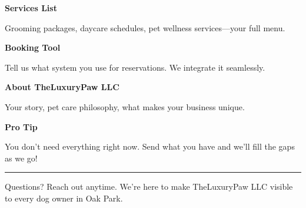 \documentclass[11pt,letterpaper]{article}
\begin{document}
\hfill
\begin{minipage}[t]{0.48\textwidth}
\begin{tcolorbox}[colframe=accent-teal, boxrule=1pt, left=0.7em, right=0.7em, top=0.5em, bottom=0.5em, arc=4pt, boxsep=0pt]
{\bfseries\small\color{accent-teal}Services List}

\vspace{0.15em}

{\small Grooming packages, daycare schedules, pet wellness services—your full menu.}
\end{tcolorbox}

\vspace{0.1em}

\begin{tcolorbox}[colframe=accent-teal, boxrule=1pt, left=0.7em, right=0.7em, top=0.5em, bottom=0.5em, arc=4pt, boxsep=0pt]
{\bfseries\small\color{accent-teal}Booking Tool}

\vspace{0.15em}

{\small Tell us what system you use for reservations. We integrate it seamlessly.}
\end{tcolorbox}

\vspace{0.1em}

\begin{tcolorbox}[colframe=accent-teal, boxrule=1pt, left=0.7em, right=0.7em, top=0.5em, bottom=0.5em, arc=4pt, boxsep=0pt]
{\bfseries\small\color{accent-teal}About TheLuxuryPaw LLC}

\vspace{0.15em}

{\small Your story, pet care philosophy, what makes your business unique.}
\end{tcolorbox}

\vspace{-0.2em}
\end{minipage}

\vspace{0.15em}

\begin{tcolorbox}[colback={accent-red!5}, colframe=accent-red!20, boxrule=0.5pt, left=0.7em, right=0.7em, top=0.4em, bottom=0.4em, arc=6pt, boxsep=0pt]

{\bfseries\small\color{accent-red}Pro Tip}

\vspace{0.1em}

{\small You don't need everything right now. Send what you have and we'll fill the gaps as we go!}

\end{tcolorbox}

\vspace{0.15em}

\noindent\hrule
\vspace{0.2em}

{\small\color{text-light}Questions? Reach out anytime. We're here to make TheLuxuryPaw LLC visible to every dog owner in Oak Park.}
\end{document}

